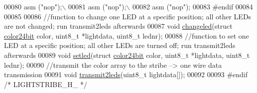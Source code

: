 \begin{DoxyCode}
00080 \textcolor{preprocessor}{               asm ("nop");\(\backslash\)}
00081 \textcolor{preprocessor}{               asm ("nop");\(\backslash\)}
00082 \textcolor{preprocessor}{               asm ("nop");}
00083 \textcolor{preprocessor}{#endif}
00084 
00085 
00086 \textcolor{comment}{//function to change one LED at a specific position; all other LEDs are not changed; run transmit2leds
       afterwards}
00087 \textcolor{keywordtype}{void} \hyperlink{_lightstribe_8h_a63fa595d401f0e85c1bba55ba2b1d66e}{changeled}(\textcolor{keyword}{struct} \hyperlink{structcolor24bit}{color24bit} color, uint8\_t *lightdata, uint8\_t lednr);
00088 \textcolor{comment}{//function to set one LED at a specific position; all other LEDs are turned off; run transmit2leds
       afterwards}
00089 \textcolor{keywordtype}{void} \hyperlink{_lightstribe_8h_abba9462833e30ef725eaf18c3d01eb71}{setled}(\textcolor{keyword}{struct} \hyperlink{structcolor24bit}{color24bit} color, uint8\_t *lightdata, uint8\_t lednr);
00090 \textcolor{comment}{//transmit the color array to the stribe --> one wire data transmission}
00091 \textcolor{keywordtype}{void} \hyperlink{_lightstribe_8h_aac724dad670e4a26723daf71ce6a8d8a}{transmit2leds}(uint8\_t lightdata[]);
00092 
00093 \textcolor{preprocessor}{#endif }\textcolor{comment}{/* LIGHTSTRIBE\_H\_ */}\textcolor{preprocessor}{}
\end{DoxyCode}
